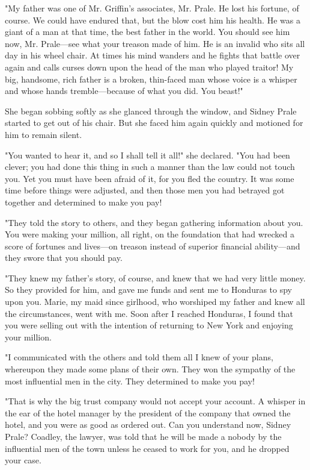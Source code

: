 \documentclass{novel}
\begin{document}
"My father was one of Mr. Griffin's associates, Mr. Prale. He lost his fortune, of course. We could have endured that, but the blow cost him his health. He was a giant of a man at that time, the best father in the world. You should see him now, Mr. Prale---see what your treason made of him. He is an invalid who sits all day in his wheel chair. At times his mind wanders and he fights that battle over again and calls curses down upon the head of the man who played traitor! My big, handsome, rich father is a broken, thin-faced man whose voice is a whisper and whose hands tremble---because of what you did. You beast!"

She began sobbing softly as she glanced through the window, and Sidney Prale started to get out of his chair. But she faced him again quickly and motioned for him to remain silent.

"You wanted to hear it, and so I shall tell it all!" she declared. "You had been clever; you had done this thing in such a manner than the law could not touch you. Yet you must have been afraid of it, for you fled the country. It was some time before things were adjusted, and then those men you had betrayed got together and determined to make you pay!

"They told the story to others, and they began gathering information about you. You were making your million, all right, on the foundation that had wrecked a score of fortunes and lives---on treason instead of superior financial ability---and they swore that you should pay.

"They knew my father's story, of course, and knew that we had very little money. So they provided for him, and gave me funds and sent me to Honduras to spy upon you. Marie, my maid since girlhood, who worshiped my father and knew all the circumstances, went with me. Soon after I reached Honduras, I found that you were selling out with the intention of returning to New York and enjoying your million.

"I communicated with the others and told them all I knew of your plans, whereupon they made some plans of their own. They won the sympathy of the most influential men in the city. They determined to make you pay!

"That is why the big trust company would not accept your account. A whisper in the ear of the hotel manager by the president of the company that owned the hotel, and you were as good as ordered out. Can you understand now, Sidney Prale? Coadley, the lawyer, was told that he will be made a nobody by the influential men of the town unless he ceased to work for you, and he dropped your case.
\end{document}
